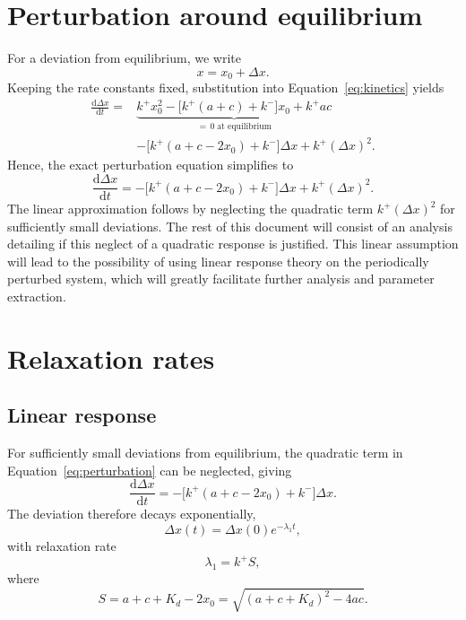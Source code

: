 \documentclass[11pt,a4paper]{article}
\begin{document}
\section{Perturbation around equilibrium}
For a deviation from equilibrium, we write
\begin{equation}
    x=x_0+\Delta x.
\end{equation}
Keeping the rate constants fixed, substitution into
Equation~\eqref{eq:kinetics} yields
\begin{equation}
\begin{aligned}
    \frac{\mathrm{d}\Delta x}{\mathrm{d}t}
    ={}&\underbrace{k^+x_0^2-\bigl[k^+(a+c)+k^-\bigr]x_0+k^+ac}
        _{=\,0\;\text{at equilibrium}}\\[0.8em]
       &-\bigl[k^+(a+c-2x_0)+k^-\bigr]\Delta x
        +k^+(\Delta x)^2.
\end{aligned}
\end{equation}
Hence, the exact perturbation equation simplifies to
\begin{equation}
    \boxed{\displaystyle
    \frac{\mathrm{d}\Delta x}{\mathrm{d}t}
    =-\bigl[k^+(a+c-2x_0)+k^-\bigr]\Delta x
     +k^+(\Delta x)^2.}
    \label{eq:perturbation}
\end{equation}
The linear approximation follows by neglecting the quadratic term
$k^+(\Delta x)^2$ for sufficiently small deviations. The rest of this document will consist of an analysis detailing if this neglect of a quadratic response is justified. This linear assumption will lead to the possibility of using linear response theory on the periodically perturbed system, which will greatly facilitate further analysis and parameter extraction.
\section{Relaxation rates}
\subsection{Linear response}

For sufficiently small deviations from equilibrium, the quadratic term
in Equation~\eqref{eq:perturbation} can be neglected, giving
\begin{equation}
    \frac{\mathrm{d}\Delta x}{\mathrm{d}t}
    = -\bigl[k^+(a+c-2x_0)+k^-\bigr]\Delta x.
\end{equation}
The deviation therefore decays exponentially,
\begin{equation}
    \Delta x(t)=\Delta x(0)e^{-\lambda_1 t},
\end{equation}
with relaxation rate
\begin{equation}
    \boxed{\lambda_1 = k^+S,}
\end{equation}
where
\begin{equation}
    S = a+c+K_d-2x_0
      = \sqrt{(a+c+K_d)^2-4ac}.
\end{equation}
\end{document}
